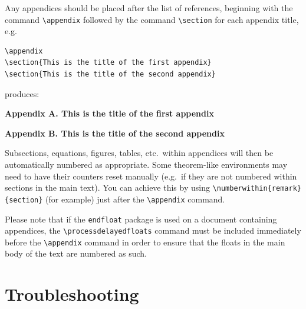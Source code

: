 \documentclass[]{interact}
\theoremstyle{plain}%
\theoremstyle{definition}
\theoremstyle{remark}
\begin{document}
Any appendices should be placed after the list of references, beginning with the command \verb"\appendix" followed by the command \verb"\section" for each appendix title, e.g.
\begin{verbatim}
\appendix
\section{This is the title of the first appendix}
\section{This is the title of the second appendix}
\end{verbatim}
produces:\medskip

\noindent\textbf{Appendix A. This is the title of the first appendix}\medskip

\noindent\textbf{Appendix B. This is the title of the second appendix}\medskip

\noindent Subsections, equations, figures, tables, etc.\ within appendices will then be automatically numbered as appropriate. Some theorem-like environments may need to have their counters reset manually (e.g.\ if they are not numbered within sections in the main text). You can achieve this by using \verb"\numberwithin{remark}{section}" (for example) just after the \verb"\appendix" command.

Please note that if the \verb"endfloat" package is used on a document containing appendices, the \verb"\processdelayedfloats" command must be included immediately before the \verb"\appendix" command in order to ensure that the floats in the main body of the text are numbered as such.


\appendix

\section{Troubleshooting}
\end{document}
